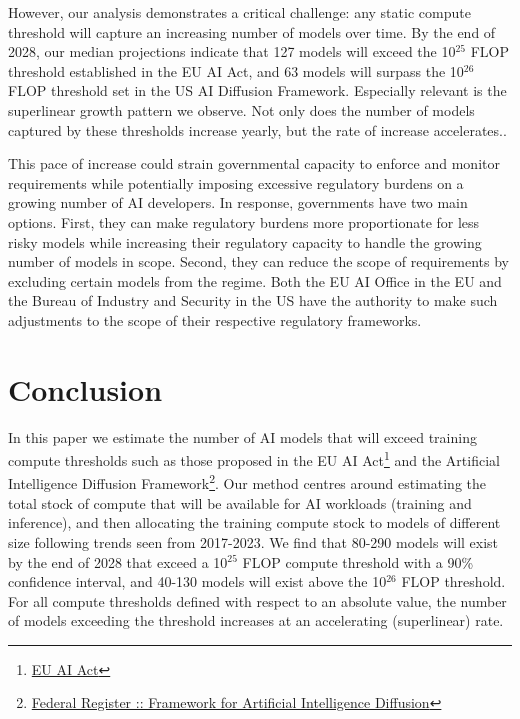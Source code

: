 \documentclass[11pt]{article}
\begin{document}
However, our analysis demonstrates a critical challenge: any static compute threshold will capture an increasing number of models over time. By the end of 2028, our median projections indicate that 127 models will exceed the 10$^{25}$ FLOP threshold established in the EU AI Act, and 63 models will surpass the 10$^{26}$ FLOP threshold set in the US AI Diffusion Framework. Especially relevant is the superlinear growth pattern we observe. Not only does the number of models captured by these thresholds increase yearly, but the rate of increase accelerates..

This pace of increase could strain governmental capacity to enforce and monitor requirements while potentially imposing excessive regulatory burdens on a growing number of AI developers. In response, governments have two main options. First, they can make regulatory burdens more proportionate for less risky models while increasing their regulatory capacity to handle the growing number of models in scope. Second, they can reduce the scope of requirements by excluding certain models from the regime. Both the EU AI Office in the EU and the Bureau of Industry and Security in the US have the authority to make such adjustments to the scope of their respective regulatory frameworks.

\section{Conclusion}

In this paper we estimate the number of AI models that will exceed training compute thresholds such as those proposed in the EU AI Act\footnote{\href{https://artificialintelligenceact.eu/}{EU AI Act}} and the Artificial Intelligence Diffusion Framework\footnote{\href{https://www.federalregister.gov/documents/2025/01/15/2025-00636/framework-for-artificial-intelligence-diffusion}{Federal Register :: Framework for Artificial Intelligence Diffusion}}. Our method centres around estimating the total stock of compute that will be available for AI workloads (training and inference), and then allocating the training compute stock to models of different size following trends seen from 2017-2023. We find that 80-290 models will exist by the end of 2028 that exceed a 10$^{25}$ FLOP compute threshold with a 90\% confidence interval, and 40-130 models will exist above the 10$^{26}$ FLOP threshold. For all compute thresholds defined with respect to an absolute value, the number of models exceeding the threshold increases at an accelerating (superlinear) rate.
\end{document}
